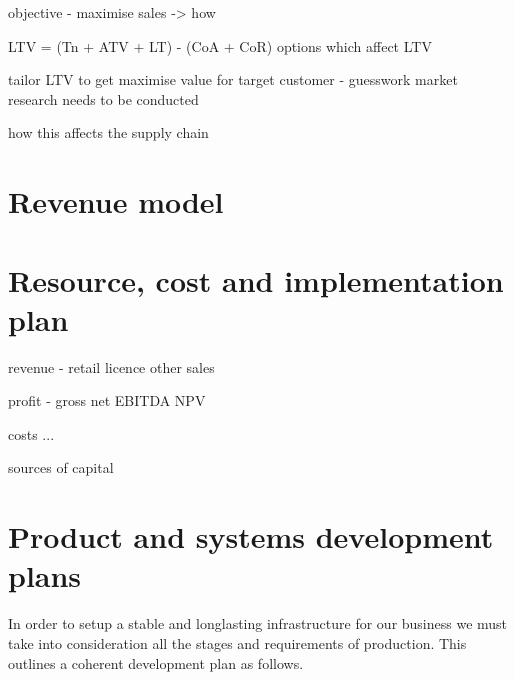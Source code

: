 \documentclass{article}
\begin{document}
objective - maximise sales -> how

LTV = (Tn + ATV + LT) - (CoA + CoR) 
options which affect LTV

tailor LTV to get maximise value for target customer - guesswork market research
needs to be conducted

how this affects the supply chain
\section{Revenue model}
\section{Resource, cost and implementation plan}
revenue
 - retail
   licence
   other sales

profit
 - gross
   net
   EBITDA
   NPV

costs
 ...

sources of capital
\section{Product and systems development plans}
In order to setup a stable and longlasting infrastructure for our business we must take into consideration all the stages and requirements of production. This outlines a coherent development plan as follows.
\end{document}
